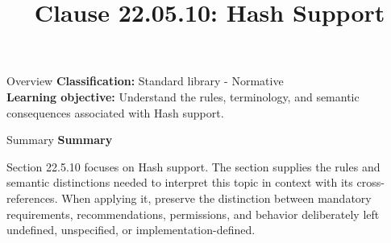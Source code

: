 \documentclass[10pt,letterpaper]{article}
\title{Clause 22.05.10: Hash Support}
\author{}
\date{}
\begin{document}
\maketitle
\begin{CornellOverviewBox}{Overview}
\textbf{Classification:} Standard library - Normative\\[2pt]
\textbf{Learning objective:} Understand the rules, terminology, and semantic consequences associated with Hash support.
\end{CornellOverviewBox}\begin{CornellSummaryBox}{Summary}
{\sffamily\bfseries\color{Accent} Summary}\par\vspace{3pt}Section 22.5.10 focuses on Hash support. The section supplies the rules and semantic distinctions needed to interpret this topic in context with its cross-references. When applying it, preserve the distinction between mandatory requirements, recommendations, permissions, and behavior deliberately left undefined, unspecified, or implementation-defined.
\end{CornellSummaryBox}
\end{document}
